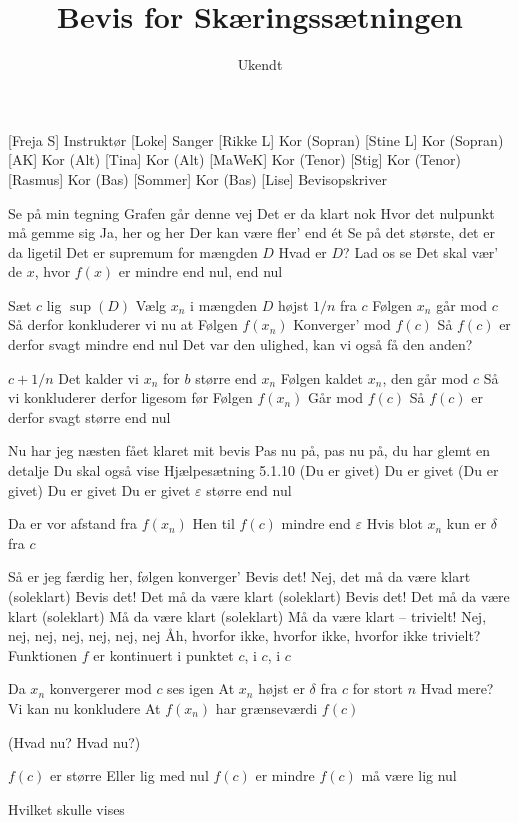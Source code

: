 \documentclass[a4paper,11pt]{article}
\title{Bevis for Skæringssætningen}
\author{Ukendt}
\begin{document}
\maketitle

\begin{roles}
[Freja S] Instruktør
[Loke] Sanger
[Rikke L] Kor (Sopran)
[Stine L] Kor (Sopran)
[AK] Kor (Alt)
[Tina] Kor (Alt)
[MaWeK] Kor (Tenor)
[Stig] Kor (Tenor)
[Rasmus] Kor (Bas)
[Sommer] Kor (Bas)
[Lise] Bevisopskriver
\end{roles}

\begin{song}
 Se på min tegning
Grafen går denne vej
Det er da klart nok
Hvor det nulpunkt må gemme sig
Ja, her og her
Der kan være fler' end ét
Se på det største, det er da ligetil
Det er supremum for mængden $D$
Hvad er $D$? Lad os se
Det skal vær' de $x$, hvor $f(x)$ er mindre end nul, end nul

 Sæt $c$ lig $\sup(D)$
Vælg $x_n$ i mængden $D$ højst $1 / n$ fra $c$
Følgen $x_n$ går mod $c$
Så derfor konkluderer vi nu at
Følgen $f(x_n)$
Konverger' mod $f(c)$
Så $f(c)$ er derfor svagt mindre end nul
Det var den ulighed, kan vi også få den anden?

 $c + 1 / n$
Det kalder vi $x_n$ for $b$ større end $x_n$
Følgen kaldet $x_n$, den går mod $c$
Så vi konkluderer derfor ligesom før
Følgen $f(x_n)$
Går mod $f(c)$
Så $f(c)$ er derfor svagt større end nul

 Nu har jeg næsten fået klaret mit bevis
 Pas nu på, pas nu på, du har glemt en detalje
Du skal også vise Hjælpesætning 5.1.10
(Du er givet) Du er givet
(Du er givet) Du er givet
Du er givet $\varepsilon$ større end nul

 Da er vor afstand fra $f(x_n)$
 Hen til $f(c)$ mindre end $\varepsilon$
Hvis blot $x_n$ kun er $\delta$ fra $c$

 Så er jeg færdig her, følgen konverger'
 Bevis det! Nej, det må da være klart (soleklart)
Bevis det! Det må da være klart (soleklart)
Bevis det! Det må da være klart (soleklart)
Må da være klart (soleklart)
Må da være klart -- trivielt!
 Nej, nej, nej, nej, nej, nej, nej
 Åh, hvorfor ikke, hvorfor ikke, hvorfor ikke trivielt?
 Funktionen $f$ er kontinuert i punktet $c$, i $c$, i $c$

 Da $x_n$ konvergerer mod $c$ ses igen
At $x_n$ højst er $\delta$ fra $c$ for stort $n$
Hvad mere? Vi kan nu konkludere
At $f(x_n)$ har grænseværdi $f(c)$

 (Hvad nu? Hvad nu?)

 $f(c)$ er større
Eller lig med nul
$f(c)$ er mindre
$f(c)$ må være lig nul

 Hvilket skulle vises
\end{song}
\end{document}
